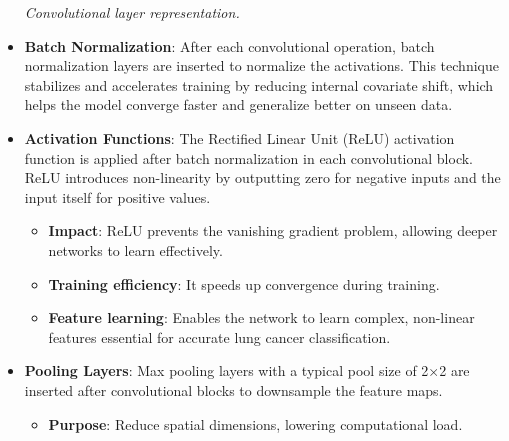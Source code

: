 \begin{itemize}
\begin{center}
        \small\textit{Convolutional layer representation. \cite{ar2019}}
    \end{center}
    \vspace{1em}

    \item \textbf{Batch Normalization}: After each convolutional operation, batch normalization 
    layers are inserted to normalize the activations. This technique stabilizes and accelerates 
    training by reducing internal covariate shift, which helps the model converge faster and 
    generalize better on unseen data.\cite{sr2025}

    \item \textbf{Activation Functions}: The Rectified Linear Unit (ReLU) activation function is 
    applied after batch normalization in each convolutional block. ReLU introduces non-linearity by 
    outputting zero for negative inputs and the input itself for positive values.

        \begin{itemize}
            \item \textbf{Impact}: ReLU prevents the vanishing gradient problem, allowing deeper 
            networks to learn effectively.

            \item \textbf{Training efficiency}: It speeds up convergence during training.
            
            \item \textbf{Feature learning}: Enables the network to learn complex, non-linear 
            features essential for accurate lung cancer classification. \cite{sr2025}
        \end{itemize}

    \item \textbf{Pooling Layers}: Max pooling layers with a typical pool size of 2×2 are inserted 
    after convolutional blocks to downsample the feature maps.

        \begin{itemize}
            \item \textbf{Purpose}: Reduce spatial dimensions, lowering computational load.
            

\end{itemize}
\end{itemize}
